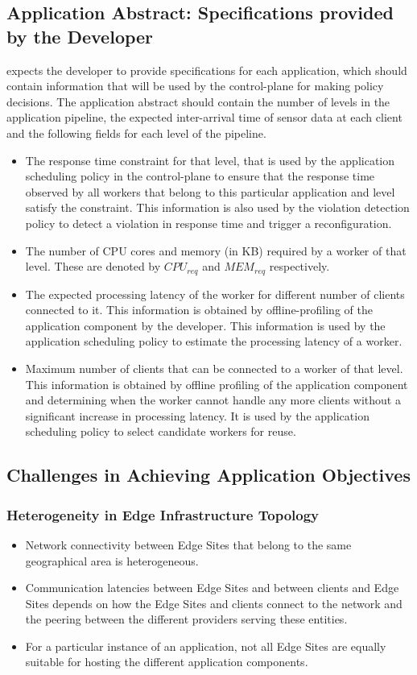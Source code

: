 \subsection{Application Abstract: Specifications provided by the Developer}
\oneedge{} expects the developer to provide specifications for each application, which should contain information that will be used by the control-plane for making policy decisions. The application abstract should contain the number of levels in the application pipeline, the expected inter-arrival time of sensor data at each client and the following fields for each level of the pipeline.
\begin{itemize}
\item The response time constraint for that level, that is used by the application scheduling policy in the control-plane to ensure that the response time observed by all workers that belong to this particular application and level satisfy the constraint. This information is also used by the violation detection policy to detect a violation in response time and trigger a reconfiguration.
\item The number of CPU cores and memory (in KB) required by a worker of that level. These are denoted by $CPU_{req}$ and $MEM_{req}$ respectively.
\item The expected processing latency of the worker for different number of clients connected to it. This information is obtained by offline-profiling of the application component by the developer. This information is used by the application scheduling policy to estimate the processing latency of a worker.
\item Maximum number of clients that can be connected to a worker of that level. This information is obtained by offline profiling of the application component and determining when the worker cannot handle any more clients without a significant increase in processing latency. It is used by the application scheduling policy to select candidate workers for reuse.
\end{itemize}

\subsection{Challenges in Achieving Application Objectives}

\subsubsection{Heterogeneity in Edge Infrastructure Topology}
\begin{itemize}
\item Network connectivity between Edge Sites that belong to the same geographical area is heterogeneous.
\item Communication latencies between Edge Sites and between clients and Edge Sites depends on how the Edge Sites and clients connect to the network and the peering between the different providers serving these entities.
\item For a particular instance of an application, not all Edge Sites are equally suitable for hosting the different application components.
\end{itemize}

